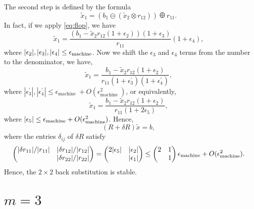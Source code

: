 The second step is defined by the formula 
\[
    \tilde x_1 = \left( b_1 \ominus (\tilde x_2 \otimes r_{ 12 } ) \right) \odiv r_{ 11 } . 
\]
In fact, if we apply \eqref{eq:flop}, we have 
\[
    \tilde x_1 = \frac{(b_1 - \tilde x_2 r_{ 12 } (1+\epsilon _2))(1+\epsilon _3)}{r_{11}} (1+\epsilon _4),
\]
where $|\epsilon _2|, |\epsilon _3|, |\epsilon _4| \le \epsilon_{\text{machine}}$. Now we shift the $ \epsilon _3 $ and $\epsilon _4$ terms from the number to the denominator, we have, 
\[
    \tilde{x}_1=\frac{b_1-\tilde{x}_2 r_{12}\left(1+\epsilon_2\right)}{r_{11}\left(1+\epsilon_3^{\prime}\right)\left(1+\epsilon_4^{\prime}\right)},
\]
where $ \left|\epsilon_3^{\prime}\right|,\left|\epsilon_4^{\prime}\right| \leq \epsilon_{\text {machine }}+O\left(\epsilon_{\text {machine }}^2\right) $, or equivalently, 
\begin{equation}
    \label{eq:m=2 x1}
    \tilde{x}_1=\frac{b_1-\tilde{x}_2 r_{12}\left(1+\epsilon_2\right)}{r_{11}\left(1+2 \epsilon_5\right)},
\end{equation} 
where $|\epsilon _5| \le \epsilon_{\text{machine}} + O(\epsilon_{\text{machine}}^2)$.  Hence, 
\[
    (R+ \delta R) \tilde x = b, 
\]
where the entries $\delta _{ ij } $ of $\delta R$ satisfy
\[
    \begin{pmatrix}
        |\delta r_{ 11 } | /|r_{ 11 } | &  |\delta r_{ 12 } | / |r_{ 12} |   \\
         &  |\delta  r_{ 22 } |/ |r_{ 22 }|  \\ 
    \end{pmatrix}  = \begin{pmatrix}
        2|\epsilon _5| &  |\epsilon _2| \\
         &  |\epsilon _1| \\
    \end{pmatrix} \le \begin{pmatrix}
        2 &  1 \\
         &  1 \\
    \end{pmatrix}\epsilon_{\text{machine}} + O(\epsilon_{\text{machine}}^2).   
\]
Hence, the $2\times 2$ back substitution is stable.  

\section{$m=3$} 

